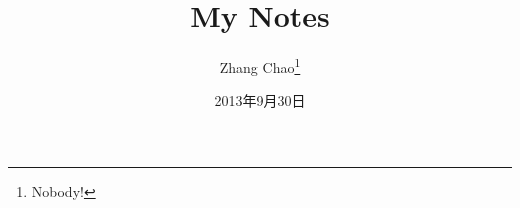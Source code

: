 \documentclass[a4paper, 11pt]{book}
\begin{document}
\title{\Huge \textbf{My Notes}}
\author{Zhang Chao\footnote{Nobody!}}
\date{2013年9月30日}
\maketitle
\end{document}
